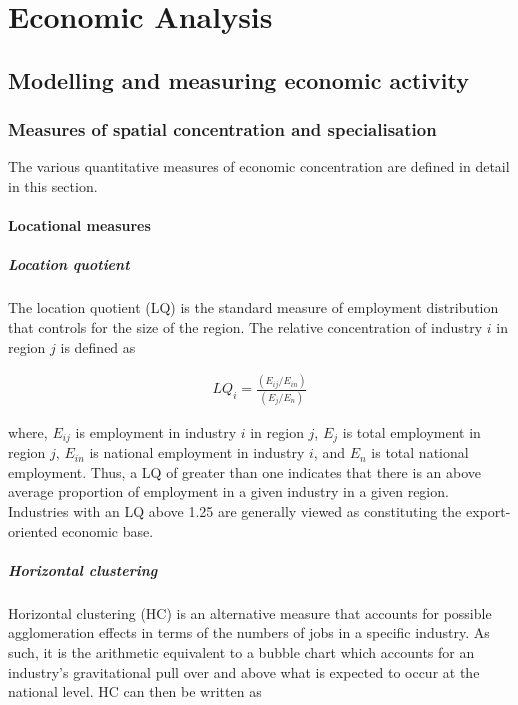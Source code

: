 \chapter{Economic Analysis}\label{chap_EconAnalysis}

\section{Modelling and measuring economic activity}
\subsection{Measures of spatial concentration and specialisation}
The various quantitative measures of economic concentration are defined in detail in this section.

\subsubsection{Locational measures}

\paragraph{Location quotient}
The location quotient (LQ) is the standard measure of employment distribution that controls for the size of the region. The relative
concentration of industry $i$ in region $j$ is defined as

\begin{eqnarray}
LQ_{i} = \frac{(E_{ij}/E_{in})}{(E_{j}/E_{n})}
\end{eqnarray}

\noindent where, $E_{ij}$ is employment in industry $i$ in region $j$, $E_{j}$ is total employment in region $j$, $E_{in}$ is national employment in industry $i$, and $E_{n}$ is total national employment. Thus, a LQ of greater than one indicates that there is an above average proportion of employment in a given industry in a given region. Industries with an LQ above 1.25 are generally viewed
as constituting the export-oriented economic base.

\paragraph{Horizontal clustering}
Horizontal clustering (HC) is an alternative measure that accounts for possible agglomeration effects in terms of the numbers of jobs in a specific industry. As such, it is the arithmetic equivalent to a bubble chart which accounts for an industry's gravitational pull over and above what is expected to occur at the national level. HC can then be written as

